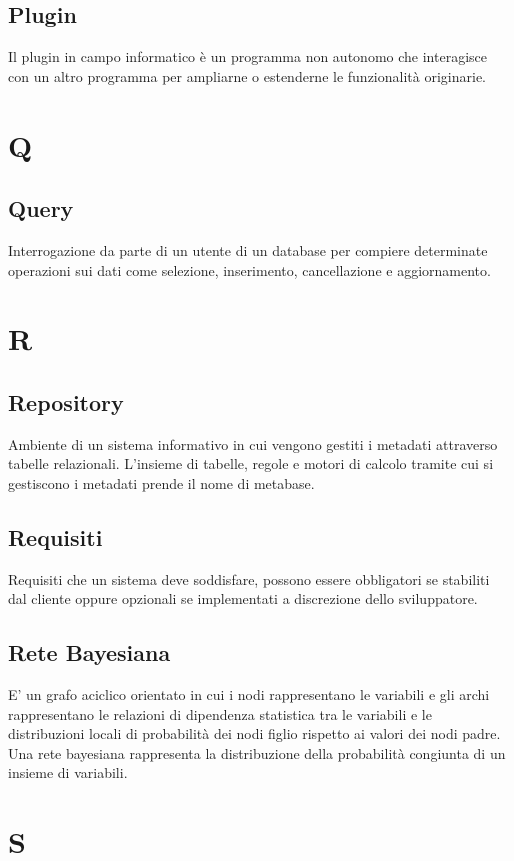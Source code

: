     \subsection*{Plugin}
Il plugin in campo informatico è un programma non autonomo che interagisce con un altro programma per ampliarne o estenderne le funzionalità originarie.
\newpage

\section{Q}
    \subsection*{Query}
Interrogazione da parte di un utente di un database per compiere determinate operazioni sui dati come selezione, inserimento, cancellazione e aggiornamento.
\newpage

\section{R}
    \subsection*{Repository}
Ambiente di un sistema informativo in cui vengono gestiti i metadati attraverso tabelle relazionali. L’insieme di tabelle, regole e motori di calcolo tramite cui si gestiscono i metadati prende il nome di metabase.
    \subsection*{Requisiti}
Requisiti che un sistema deve soddisfare, possono essere obbligatori se stabiliti dal cliente oppure opzionali se implementati a discrezione dello sviluppatore.
    \subsection*{Rete Bayesiana}
E’ un grafo aciclico orientato in cui i nodi rappresentano le variabili e gli archi rappresentano le relazioni di dipendenza statistica tra le variabili e le distribuzioni locali di probabilità dei nodi figlio rispetto ai valori dei nodi padre. Una rete bayesiana rappresenta la distribuzione della probabilità congiunta di un insieme di variabili.
\newpage

\section{S}
